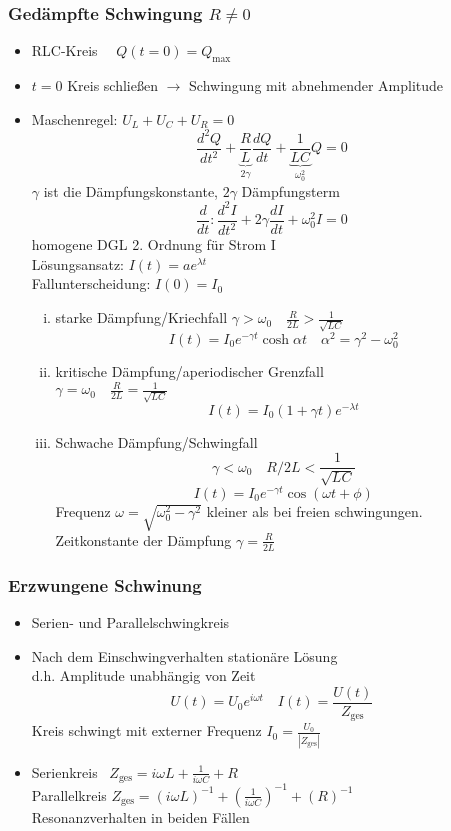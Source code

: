 \documentclass[titlepage,12pt,a4paper,ngerman]{report}
\newcommand{\tx}[1]{\textrm{#1}}
\newcommand{\ub}[1]{\underbrace{#1}}
\begin{document}
 \subsubsection{Gedämpfte Schwingung $ R \neq 0 $}
 \begin{itemize}
 	\item RLC-Kreis $ \quad Q(t=0) = Q_{\tx{max}} $
 	\item $ t=0 $ Kreis schließen $ \rightarrow $ Schwingung mit abnehmender Amplitude
 	\item Maschenregel: $ U_L + U_C + U_R = 0 $\\
 	$$\frac{d^2 Q}{dt^2} + \ub{\frac{R}{L}}_{2 \gamma} \frac{dQ}{dt} + \ub{\frac{1}{LC}}_{\omega^2_0} Q = 0 $$
 	$ \gamma $ ist die Dämpfungskonstante, $ 2 \gamma $ Dämpfungsterm
 	$$ \frac{d}{dt} : \frac{d^2I}{dt^2} + 2 \gamma \frac{dI}{dt} + \omega^2_0 I = 0 $$
 	homogene DGL 2. Ordnung für Strom I\\
 	Lösungsansatz: $ I(t) = a e ^{\lambda t} $\\
 	Fallunterscheidung: $ I(0) = I_0 $
 	\begin{enumerate}[i)]
 		\item starke Dämpfung/Kriechfall $ \gamma > \omega_0 \quad \frac{R}{2L} > \frac{1}{\sqrt{LC}} $\\
 		$$ I(t) = I_0 e^{-\gamma t} \cosh \alpha t \quad \alpha^2 = \gamma^2 - \omega^2_0 $$
 		\item kritische Dämpfung/aperiodischer Grenzfall\\
 		$ \gamma = \omega_0 \quad \frac{R}{2L} = \frac{1}{\sqrt{LC}} $\\
 		$$ I(t) = I_0 (1+\gamma t) e ^{-\lambda t} $$
 		\item Schwache Dämpfung/Schwingfall
 		$$\gamma < \omega_0 \quad R/2L < \frac{1}{\sqrt{LC}}$$
 		$$I(t) = I_0 e^{-\gamma t} \cos (\omega t + \phi)$$
 		Frequenz $\omega = \sqrt{\omega_0^2 - \gamma^2}$ kleiner als bei freien schwingungen.\\
 		Zeitkonstante der Dämpfung $\gamma = \frac{R}{2L}$
 	\end{enumerate}
 \end{itemize}
 \subsubsection{Erzwungene Schwinung}
 \begin{itemize}
 	\item Serien- und Parallelschwingkreis
 	\item Nach dem Einschwingverhalten stationäre Lösung\\
 	d.h. Amplitude unabhängig von Zeit
 	$$U(t) = U_0 e^{i\omega t} \quad I(t) = \frac{U(t)}{Z_{\tx{ges}}} $$
 	Kreis schwingt mit externer Frequenz $ I_0 = \frac{U_0}{|Z_{\tx{ges}}|} $
 	\item Serienkreis $\ \; Z_{\tx{ges}} = i \omega L + \frac{1}{i \omega C} + R $\\
 	Parallelkreis $ Z_{\tx{ges}} = (i \omega L)^{-1} + (\frac{1}{i \omega C})^{-1} + (R)^{-1} $\\
 	Resonanzverhalten in beiden Fällen
 \end{itemize}
\end{document}

